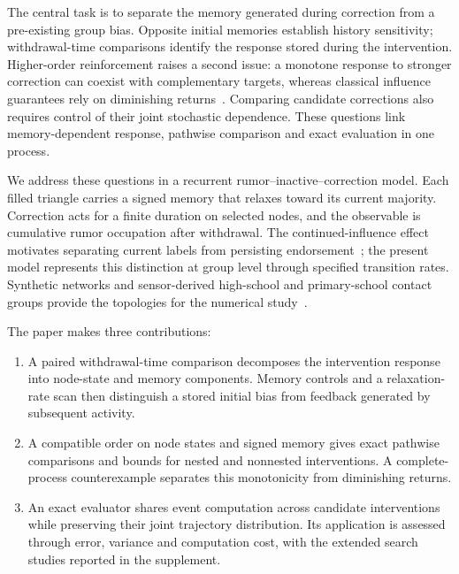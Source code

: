 \documentclass[final,5p,times,twocolumn,sort&compress]{elsarticle}
\theoremstyle{plain}
\begin{document}
The central task is to separate the memory generated during correction from a pre-existing group bias. Opposite initial memories establish history sensitivity; withdrawal-time comparisons identify the response stored during the intervention. Higher-order reinforcement raises a second issue: a monotone response to stronger correction can coexist with complementary targets, whereas classical influence guarantees rely on diminishing returns~\cite{kempe2003,nemhauser1978}. Comparing candidate corrections also requires control of their joint stochastic dependence. These questions link memory-dependent response, pathwise comparison and exact evaluation in one process.

We address these questions in a recurrent rumor--inactive--correction model. Each filled triangle carries a signed memory that relaxes toward its current majority. Correction acts for a finite duration on selected nodes, and the observable is cumulative rumor occupation after withdrawal. The continued-influence effect motivates separating current labels from persisting endorsement~\cite{lewandowsky2012}; the present model represents this distinction at group level through specified transition rates. Synthetic networks and sensor-derived high-school and primary-school contact groups provide the topologies for the numerical study~\cite{benson2018,highschool2015,primaryschool2011}.

The paper makes three contributions:
\begin{enumerate}
\item A paired withdrawal-time comparison decomposes the intervention response into node-state and memory components. Memory controls and a relaxation-rate scan then distinguish a stored initial bias from feedback generated by subsequent activity.
\item A compatible order on node states and signed memory gives exact pathwise comparisons and bounds for nested and nonnested interventions. A complete-process counterexample separates this monotonicity from diminishing returns.
\item An exact evaluator shares event computation across candidate interventions while preserving their joint trajectory distribution. Its application is assessed through error, variance and computation cost, with the extended search studies reported in the supplement.
\end{enumerate}
\end{document}
